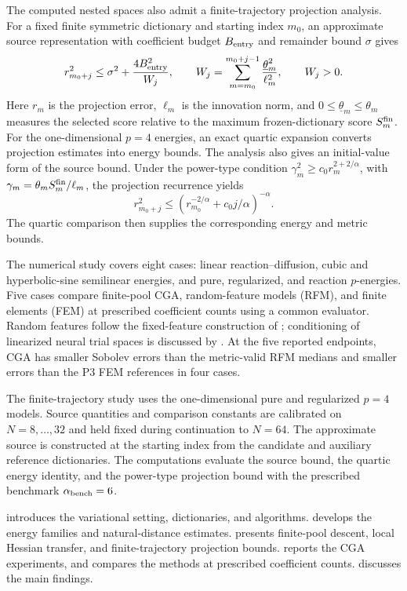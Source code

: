 The computed nested spaces also admit a finite-trajectory projection analysis. For a fixed finite symmetric dictionary and starting index \(m_0\), an approximate source representation with coefficient budget \(B_{\rm entry}\) and remainder bound \(\sigma\) gives
\[
 r_{m_0+j}^2\le \sigma^2+\frac{4B_{\rm entry}^2}{W_j},
 \qquad W_j=\sum_{m=m_0}^{m_0+j-1}\frac{\underline\theta_m^2}{\ell_m^2},
 \qquad W_j>0.
\]
Here \(r_m\) is the projection error, \(\ell_m\) is the innovation norm, and \(0\le\underline\theta_m\le\theta_m\) measures the selected score relative to the maximum frozen-dictionary score \(S_m^{\rm fin}\). For the one-dimensional \(p=4\) energies, an exact quartic expansion converts projection estimates into energy bounds. The analysis also gives an initial-value form of the source bound. Under the power-type condition \(\gamma_m^2\ge c_0r_m^{2+2/\alpha}\), with \(\gamma_m=\theta_m S_m^{\rm fin}/\ell_m\), the projection recurrence yields
\[
 r_{m_0+j}^2\le \left(r_{m_0}^{-2/\alpha}+c_0j/\alpha\right)^{-\alpha}.
\]
The quartic comparison then supplies the corresponding energy and metric bounds.

The numerical study covers eight cases: linear reaction--diffusion, cubic and hyperbolic-sine semilinear energies, and pure, regularized, and reaction \(p\)-energies. Five cases compare finite-pool CGA, random-feature models (RFM), and finite elements (FEM) at prescribed coefficient counts using a common evaluator. Random features follow the fixed-feature construction of \cite{RahimiRecht2007}; conditioning of linearized neural trial spaces is discussed by \cite{ChenChiEYang2022,MaoXuXu2026}. At the five reported endpoints, CGA has smaller Sobolev errors than the metric-valid RFM medians and smaller errors than the P3 FEM references in four cases.

The finite-trajectory study uses the one-dimensional pure and regularized \(p=4\) models. Source quantities and comparison constants are calibrated on \(N=8,\ldots,32\) and held fixed during continuation to \(N=64\). The approximate source is constructed at the starting index from the candidate and auxiliary reference dictionaries. The computations evaluate the source bound, the quartic energy identity, and the power-type projection bound with the prescribed benchmark \(\alpha_{\rm bench}=6\).

 introduces the variational setting, dictionaries, and algorithms.  develops the energy families and natural-distance estimates.  presents finite-pool descent, local Hessian transfer, and finite-trajectory projection bounds.  reports the CGA experiments, and  compares the methods at prescribed coefficient counts.  discusses the main findings.
